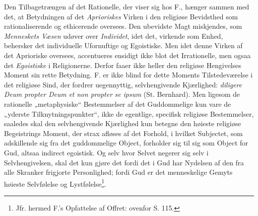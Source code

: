 Den Tilbagetrængen af det Rationelle, der viser sig hos F., hænger sammen med
det, at Betydningen af det \emph{Aprioriskes} Virken i den religiøse Bevidsthed
som rationaliserende og ethicerende oversees. Den ubevidste Magt miskjendes, som
\emph{Menneskets Væsen} udøver over \emph{Individet}, idet det, virkende som
Enhed, behersker det individuelle Ufornuftige og Egoistiske. Men idet denne
Virken af det Aprioriske oversees, accentueres ensidigt ikke blot det
Irrationelle, men ogsaa det \emph{Egoistiske} i Religionerne. Derfor faaer ikke
heller den religiøse Hengivelses Moment sin rette Betydning. F. er ikke blind for
dette Moments Tilstedeværelse i det religiøse Sind, der fordrer uegennyttig,
selvhengivende Kjærlighed: \textit{diligere Deum propter Deum et non propter se
ipsum} (St. Bernhard). Men ligesom de rationelle „metaphysiske“ Bestemmelser af
det Guddommelige kun vare de „yderste Tilknytningspunkter“, ikke de egentlige,
specifisk religiøse Bestemmelser, saaledes skal den selvhengivende Kjærlighed kun
betegne den høieste religiøse Begeistrings Moment, der strax afløses af det
Forhold, i hvilket Subjectet, som adskillende sig fra det guddommelige Object,
forholder sig til sig som Object for Gud, altsaa indirect egoistisk. Og selv hvor
Selvet negerer sig selv i Selvhengivelsen, skal det kun gjøre det fordi det i Gud
har Nydelsen af den fra alle Skranker frigjorte Personlighed; fordi Gud er det
menneskelige Gemyts høieste Selvfølelse og Lystfølelse\footnote{Jfr. hermed F.'s
Opfattelse af Offret: ovenfor S. 115.}.

